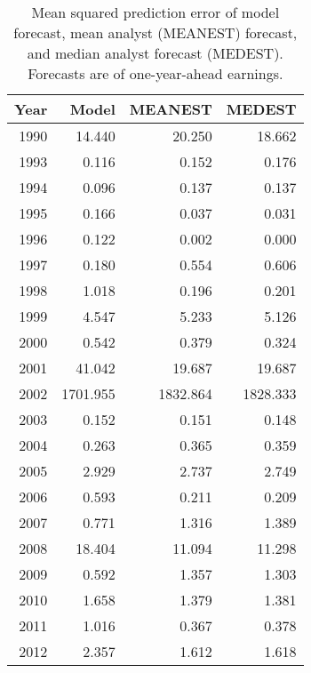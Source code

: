 \begin{table}[H]
\centering
\begin{tabular}{rrrr}
  \hline
Year & Model & MEANEST & MEDEST \\ 
  \hline
1990 & 14.440 & 20.250 & 18.662 \\ 
1993 & 0.116 & 0.152 & 0.176 \\ 
1994 & 0.096 & 0.137 & 0.137 \\ 
1995 & 0.166 & 0.037 & 0.031 \\ 
1996 & 0.122 & 0.002 & 0.000 \\ 
1997 & 0.180 & 0.554 & 0.606 \\ 
1998 & 1.018 & 0.196 & 0.201 \\ 
1999 & 4.547 & 5.233 & 5.126 \\ 
2000 & 0.542 & 0.379 & 0.324 \\ 
2001 & 41.042 & 19.687 & 19.687 \\ 
2002 & 1701.955 & 1832.864 & 1828.333 \\ 
2003 & 0.152 & 0.151 & 0.148 \\ 
2004 & 0.263 & 0.365 & 0.359 \\ 
2005 & 2.929 & 2.737 & 2.749 \\ 
2006 & 0.593 & 0.211 & 0.209 \\ 
2007 & 0.771 & 1.316 & 1.389 \\ 
2008 & 18.404 & 11.094 & 11.298 \\ 
2009 & 0.592 & 1.357 & 1.303 \\ 
2010 & 1.658 & 1.379 & 1.381 \\ 
2011 & 1.016 & 0.367 & 0.378 \\ 
2012 & 2.357 & 1.612 & 1.618 \\ 
   \hline
\end{tabular}
\captionsetup{width=3in, font=footnotesize}
\caption{Mean squared prediction error of model forecast, mean analyst (MEANEST) forecast, and 
median analyst forecast (MEDEST). Forecasts are of one-year-ahead earnings.} 
\label{spe-by-year-table-fy1}
\end{table}
